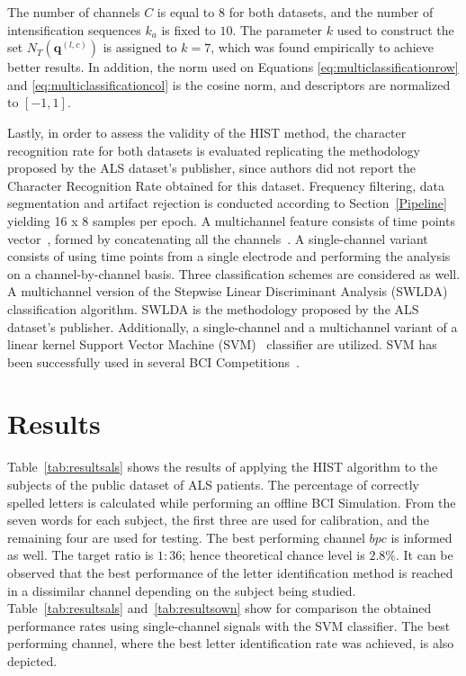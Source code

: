 \documentclass[utf8]{frontiersSCNS} %
\begin{document}
The number of channels $C$ is equal to $8$ for both datasets, and the number of intensification sequences $k_a$ is fixed to $10$.  The parameter $k$ used to construct the set $N_T(\mathbf{q}^{(l,c)})$ is assigned to $k=7$, which was found empirically to achieve better results.  In addition, the norm used on  Equations \ref{eq:multiclassificationrow} and \ref{eq:multiclassificationcol} is the cosine norm, and descriptors are normalized to $ \left[ -1, 1 \right] $.

Lastly, in order to assess the validity of the HIST method, the character recognition rate for both datasets is evaluated replicating the methodology proposed by the ALS dataset's publisher, since authors \cite{Riccio2013} did not report the Character Recognition Rate obtained for this dataset. Frequency filtering, data segmentation and artifact rejection is conducted according to Section~\ref{Pipeline} yielding 16 x 8 samples per epoch.  A multichannel feature consists of time points vector~\citep{Lotte2018}, formed by concatenating all the channels~\citep{Krusienski2006}. A single-channel variant consists of using time points from a single electrode and performing the analysis on a channel-by-channel basis.  Three classification schemes are considered as well. A multichannel version of the  Stepwise Linear Discriminant Analysis (SWLDA) classification algorithm. SWLDA is the methodology proposed by the ALS dataset's publisher. Additionally, a single-channel and a multichannel variant of a linear kernel Support Vector Machine (SVM)~\citep{Scholkopf2001} classifier are utilized.   SVM has been successfully used in several BCI Competitions~\citep{Rakotomamonjy2008}.

\section{Results} \label{Results}
\label{section:results}

Table~\ref{tab:resultsals} shows the results of applying the HIST algorithm to the subjects of the public dataset of ALS patients. The percentage of correctly spelled letters is calculated while performing an offline BCI Simulation.  From the seven words for each subject, the first three are used for calibration, and the remaining four are used for testing.  The best performing channel  $bpc$ is informed as well. The target ratio is $1:36$; hence theoretical chance level is $2.8\%$. It can be observed that the best performance of the letter identification method is reached in a dissimilar channel depending on the subject being studied.  Table~\ref{tab:resultsals} and~\ref{tab:resultsown} show for comparison the obtained performance rates using single-channel signals with the SVM classifier. The best performing channel, where the best letter identification rate was achieved, is also depicted.
\end{document}
